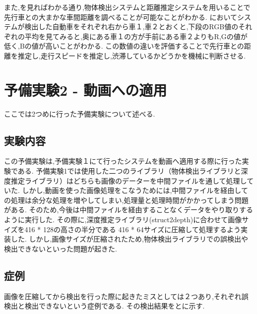 また,を見ればわかる通り,物体検出システムと距離推定システムを用いることで先行車との大まかな車間距離を調べることが可能なことがわかる.
においてシステムが検出した自動車をそれぞれ右から車１,車２とおくと,下段のRGB値のそれぞれの平均を見てみると,奥にある車１の方が手前にある車２よりもR,Gの値が低く,Bの値が高いことがわかる.
この数値の違いを評価することで先行車との距離を推定し,走行スピードを推定し,渋滞しているかどうかを機械に判断させる.


\newpage
\section{予備実験2 - 動画への適用}
ここでは2つめに行った予備実験について述べる.
\subsection{実験内容}
この予備実験は,予備実験１にて行ったシステムを動画へ適用する際に行った実験である.
予備実験1では使用した二つのライブラリ（物体検出ライブラリと深度推定ライブラリ）はどちらも画像のデーターを中間ファイルを通して処理していた.
しかし,動画を使った画像処理をこなうためには,中間ファイルを経由しての処理は余分な処理を増やしてしまい,処理量と処理時間がかかってしまう問題がある.
そのため,今後は中間ファイルを経由することなくデータをやり取りするように実行した.
その際に,深度推定ライブラリ(struct2depth)に合わせて画像サイズを416 * 128の高さの半分である 416 * 64サイズに圧縮して処理するよう実装した.
しかし,画像サイズが圧縮されたため,物体検出ライブラリでの誤検出や検出できないといった問題が起きた.

\subsection{症例}
画像を圧縮してから検出を行った際に起きたミスとしては２つあり,それぞれ誤検出と検出できないという症例である.
その検出結果をとに示す.

